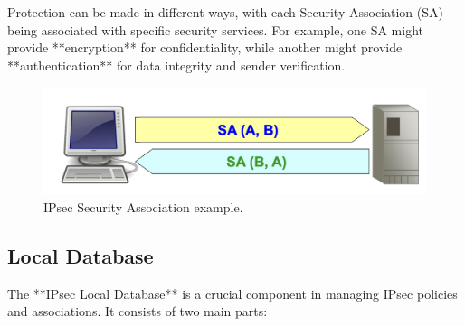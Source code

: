 \begin{tcolorbox}[colback=lightblue] 
    Protection can be made in different ways, with each Security Association (SA) being associated with specific security services. For example, one SA might provide **encryption** for confidentiality, while another might provide **authentication** for data integrity and sender verification. 
\end{tcolorbox}


\begin{figure}[H]
    \includegraphics[width=\linewidth]{Images/NetSec/SA.png}
    \caption{IPsec Security Association example.}
\end{figure}

\subsection{Local Database}

The **IPsec Local Database** is a crucial component in managing IPsec policies and associations. It consists of two main parts:

